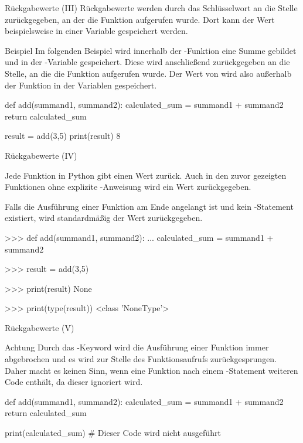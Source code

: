     \begin{frame}[fragile]{Rückgabewerte (III)}
        Rückgabewerte werden durch das  Schlüsselwort an die Stelle zurückgegeben, an der die Funktion aufgerufen wurde. Dort kann der Wert beispielsweise in einer Variable gespeichert werden.
        
        \begin{exampleblock}{Beispiel}
            Im folgenden Beispiel wird innerhalb der -Funktion eine Summe gebildet und in der -Variable gespeichert. Diese wird anschließend zurückgegeben an die Stelle, an die die Funktion aufgerufen wurde. Der Wert von  wird also außerhalb der Funktion in der Variablen  gespeichert.
\begin{pythoncode}
def add(summand1, summand2):
    calculated_sum = summand1 + summand2
    return calculated_sum

result = add(3,5)
print(result)
8
\end{pythoncode}        
        \end{exampleblock}
    \end{frame}
    
    \begin{frame}[fragile]{Rückgabewerte (IV)}
    
        Jede Funktion in Python gibt einen Wert zurück. Auch in den zuvor gezeigten Funktionen ohne explizite -Anweisung wird ein Wert zurückgegeben.
        
        Falls die Ausführung einer Funktion am Ende angelangt ist und kein -Statement existiert, wird standardmäßig der Wert  zurückgegeben.

\begin{pyconcode}
>>> def add(summand1, summand2):
...     calculated_sum = summand1 + summand2
    
>>> result = add(3,5)

>>> print(result)
None

>>> print(type(result))
<class 'NoneType'>

\end{pyconcode}
    \end{frame}
    
    \begin{frame}[fragile]{Rückgabewerte (V)}
        \begin{alertblock}{Achtung}
            Durch das -Keyword wird die Ausführung einer Funktion immer abgebrochen und es wird zur Stelle des Funktionsaufrufs zurückgesprungen. Daher macht es keinen Sinn, wenn eine Funktion nach einem -Statement weiteren Code enthält, da dieser ignoriert wird.
            
\begin{pythoncode}
def add(summand1, summand2):
    calculated_sum = summand1 + summand2
    return calculated_sum
    
    print(calculated_sum) # Dieser Code wird nicht ausgeführt
\end{pythoncode}
        \end{alertblock}
    \end{frame}
    
